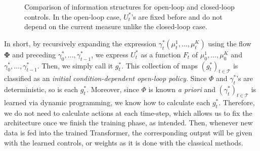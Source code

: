 \documentclass[11pt]{article}
\newcommand{\cT}{\mathcal{T}}
\begin{document}
\begin{figure}[H]
\centering
{}
\caption{Comparison of information structures for open-loop and closed-loop controls. In the open-loop case, $U_t^*$'s are fixed before and do not depend on the current measure unlike the closed-loop case.}
\label{fig:open-vs-closed}
\end{figure}

In short, by recursively expanding the expression $\gamma_t^*(\mu_t^1,\ldots,\mu_t^K)$ using the flow $\bm{\Phi}$ and preceding $\gamma_0^*,\ldots,\gamma_{t-1}^*$, we express $U_t^*$ as a function $F_t$ of $\mu_0^1,\ldots, \mu_0^K$ and $\gamma_0^*,\ldots,\gamma_{t-1}^*$. Then, we simply call it $g_t^*$. This collection of maps $(g_t^*)_{t\in\cT}$ is classified as an \emph{initial condition-dependent open-loop policy}. Since $\Phi$ and $\gamma_t^*$'s are deterministic, so is each $g_t^*$. Moreover, since $\Phi$ is known \emph{a priori} and $(\gamma_t^*)_{t\in\cT}$ is learned via dynamic programming, we know how to calculate each $g_t^*$. Therefore, we do not need to calculate actions at each time-step, which allows us to fix the architecture once we finish the training phase, as intended. Then, whenever new data is fed into the trained Transformer, the corresponding output will be given with the learned controls, or weights as it is done with the classical methods.
\end{document}
